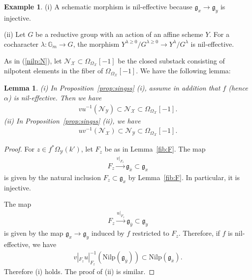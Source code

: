 \documentclass [11pt,oneside,a4paper,mathscr]{amsart}
\newtheorem{lemma}[thm]{Lemma}
\theoremstyle{definition}
\newtheorem{example}[thm]{Example}
\renewcommand{\geq}{\geqslant}
\newcommand{\Y}{\mathcal{Y}}
\newcommand{\X}{\mathcal{X}}
\newcommand{\fg}{\mathfrak{g}}
\begin{document}
\begin{example}
    (i) A schematic morphism is nil-effective because $\fg_x \to \fg_y$ is injective. 

    (ii) Let $G$ be a reductive group with an action of an affine scheme $Y$. 
    For a cocharacter $\lambda\colon \mathbb{G}_m \to G$, the morphism 
    $Y^{\lambda \geq 0}/G^{\lambda \geq 0} \to Y^{\lambda}/G^{\lambda}$ is nil-effective. 
\end{example}

As in (\ref{nilp:N}), let 
$\mathcal{N}_{\X} \subset \Omega_{\Omega_{\X}}[-1]$
be the closed substack consisting of nilpotent elements in the fiber of $\Omega_{\Omega_{\X}}[-1]$. We have the following lemma: 
\begin{lemma}\label{lem:nilpotent}
(i) In Proposition~\ref{prop:singss} (i), assume in addition that $f$ (hence $\alpha$) is nil-effective. 
Then we have 
\begin{align*}
    vu^{-1}(\mathcal{N}_{\Y}) \subset \mathcal{N}_{\X} \subset \Omega_{\Omega_{\X}}[-1].
\end{align*}
  (ii) In Proposition~\ref{prop:singss} (ii), we have 
\begin{align*}
    uv^{-1}(\mathcal{N}_{\X}) \subset \mathcal{N}_{\Y} \subset \Omega_{\Omega_{\X}}[-1].
\end{align*}  
\end{lemma}
\begin{proof}
For $z\in f^*\Omega_{\Y}(k')$, let $F_z$ be as in Lemma~\ref{fib:F}. 
    The map 
    \begin{align*}
        F_z \stackrel{v|_{F_z}}{\to} \mathfrak{g}_{\overline{x}} \subset \fg_x
    \end{align*}
    is given by the natural inclusion $F_z \subset \fg_x$ by Lemma~\ref{fib:F}. 
    In particular, it is injective. 
    
    The map 
     \begin{align*}
        F_z \stackrel{u|_{F_z}}{\to} \mathfrak{g}_{\overline{y}} \subset \fg_y
    \end{align*}
    is given by the map $\fg_x \to \fg_y$ induced by $f$ restricted to $F_z$.  Therefore, if $f$ is nil-effective, we have 
    \begin{align*}
        v|_{F_z}u|_{F_z}^{-1}(\mathrm{Nilp}(\fg_{\overline{y}})) \subset \mathrm{Nilp}(\fg_{\overline{x}}).
    \end{align*}
    Therefore (i) holds. The proof of (ii) is similar. 
\end{proof}
\end{document}
